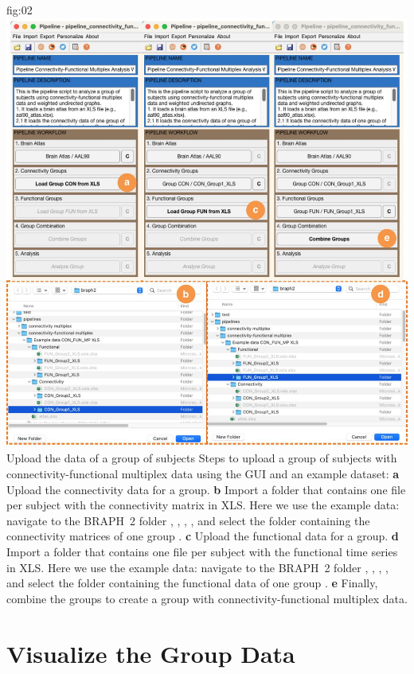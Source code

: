 \documentclass[justified]{tufte-handout}
\begin{document}
	{fig:02}
	{
	\includegraphics{fig02.jpg}
	}
	{Upload the data of a group of subjects}
	{
	Steps to upload a group of subjects with connectivity-functional multiplex data using the GUI and an example dataset: 
	{\bf a} Upload the connectivity data for a group.
	{\bf b} Import a folder that contains one file per subject with the connectivity matrix in XLS. Here we use the example data: navigate to the BRAPH~2 folder , ,  , , and select the folder containing the connectivity matrices of one group .
     {\bf c} Upload the functional data for a group.
 	{\bf d} Import a folder that contains one file per subject with the functional time series in XLS. Here we use the example data: navigate to the BRAPH~2 folder , ,  , , and select the folder containing the functional data of one group .
   {\bf e} Finally, combine the groups to create a group with connectivity-functional multiplex data.
	}


\clearpage

\section{Visualize the Group Data}
\end{document}
